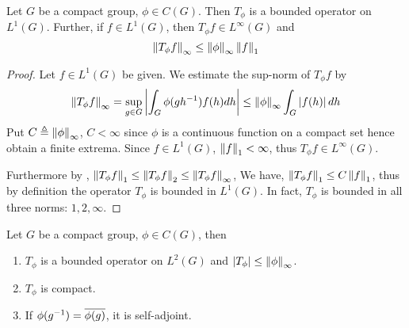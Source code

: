 \begin{prop} \label{Tphi-bounded}
  Let $G$ be a compact group, $\phi \in C(G)$.  Then $T_{\phi}$ is a bounded
  operator on $L^1(G)$. Further, if $f \in L^1(G)$, then $T_{\phi}f \in
  L^{\infty}(G)$ and
  \[
    \left\lVert T_{\phi}f\right\rVert_{\infty} \leq \left\lVert\phi\right\rVert_{\infty} \left\lVert f\right\rVert_1
  \]
\end{prop}

\begin{proof}
  Let $f \in L^1(G)$ be given. We estimate the sup-norm of $T_{\phi}f$ by
  \[
    \left\lVert T_{\phi} f\right\rVert_{\infty}
    = \sup_{g \in G} \left|\int_G \phi(g h^{-1}) f(h) dh\right|
    \leq \left\lVert\phi\right\rVert_{\infty} \int_G \left|f(h)\right| dh
  \]
  Put $C \triangleq \left\lVert\phi\right\rVert_{\infty}$, $C < \infty$ since $\phi$ is a
  continuous function on a compact set hence obtain a finite extrema.  Since $f
  \in L^1(G)$, $\left\lVert f\right\rVert_1 < \infty$, thus $T_{\phi}f \in L^{\infty}(G)$.
  
  Furthermore by , $\left\lVert T_{\phi} f\right\rVert_1 \leq \left\lVert T_{\phi} f\right\rVert_2
  \leq \left\lVert T_{\phi} f\right\rVert_{\infty}$,  We have, $\left\lVert T_{\phi}f\right\rVert_1 \leq C
  \left\lVert f\right\rVert_1$, thus by definition the operator $T_{\phi}$ is bounded in
  $L^1(G)$. In fact, $T_{\phi}$ is bounded in all three norms: $1,2,\infty$.
\end{proof}

\begin{prop}\label{self-adjoint-compact}
  Let $G$ be a compact group, $\phi \in C(G)$, then
  \begin{enumerate}
    \item $T_{\phi}$ is a bounded operator on $L^2(G)$ and $\left|T_{\phi}\right| \leq \left\lVert\phi\right\rVert_{\infty}$.
    \item $T_{\phi}$ is compact.
    \item If $\phi(g^{-1}) = \overline{\phi(g)}$, it is self-adjoint.
  \end{enumerate}
\end{prop}


